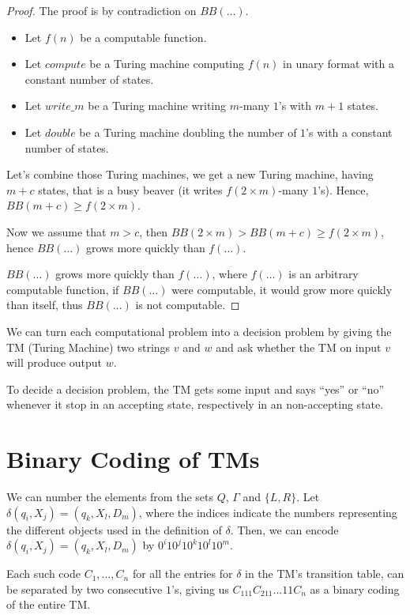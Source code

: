 \documentclass[a4paper,11pt]{report}
\begin{document}
\begin{proof}
  The proof is by contradiction on $BB(\dots)$.
  \begin{itemize}
  \item Let $f(n)$ be a computable function.
  \item Let $compute$ be a Turing machine computing $f(n)$ in unary format with
    a constant number of states.
  \item Let $write\_m$ be a Turing machine writing $m$-many $1$'s with $m+1$
    states.
  \item Let $double$ be a Turing machine doubling the number of $1$'s with a
    constant number of states.
  \end{itemize}

  Let's combine those Turing machines, we get a new Turing machine, having $m+c$
  states, that is a busy beaver (it writes $f(2 \times m)$-many $1$'s). Hence,
  $BB(m + c) \geq f(2 \times m)$.

  Now we assume that $m > c$, then $BB(2 \times m) > BB(m + c) \geq f(2 \times
  m)$, hence $BB(\dots)$ grows more quickly than $f(\dots)$.

  $BB(\dots)$ grows more quickly than $f(\dots)$, where $f(\dots)$ is an
  arbitrary computable function, if $BB(\dots)$ were computable, it would grow
  more quickly than itself, thus $BB(\dots)$ is not computable.
\end{proof}

We can turn each computational problem into a decision problem by giving the TM
(Turing Machine) two strings $v$ and $w$ and ask whether the TM on input $v$
will produce output $w$.

To decide a decision problem, the TM gets some input and says ``yes'' or ``no''
whenever it stop in an accepting state, respectively in an non-accepting state.

\section{Binary Coding of TMs}

We can number the elements from the sets $Q$, $\Gamma$ and $\{L,R\}$. Let
$\delta(q_i,X_j) = (q_k,X_l,D_m)$, where the indices indicate the numbers
representing the different objects used in the definition of $\delta$. Then, we
can encode $\delta(q_i,X_j) = (q_k,X_l,D_m)$ by $0^i10^j10^k10^l10^m$.

Each such code $C_1,\dots,C_n$ for all the entries for $\delta$ in the TM's
transition table, can be separated by two consecutive $1$'s, giving us
$C_111C_211\dots11C_n$ as a binary coding of the entire TM.
\end{document}
